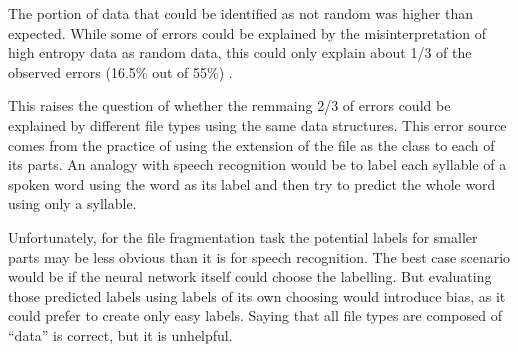 The portion of data that could be identified as not random was higher than expected. While some of errors could be explained by the misinterpretation of high entropy data as random data, this could only explain about 1/3 of the observed errors (16.5\% out of 55\%) .

This raises the question of whether the remmaing 2/3 of errors could be explained by different file types using the same data structures. This error source comes from the practice of using the extension of the file as the class to each of its parts. An analogy with speech recognition would be to label each syllable of a spoken word using the word as its label and then try to predict the whole word using only a syllable.

Unfortunately, for the file fragmentation task the potential labels for smaller parts may be less obvious than it is for speech recognition. The best case scenario would be if the neural network itself could choose the labelling. But evaluating those predicted labels using labels of its own choosing would introduce bias, as it could prefer to create only easy labels. Saying that all file types are composed of ``data'' is correct, but it is unhelpful.





